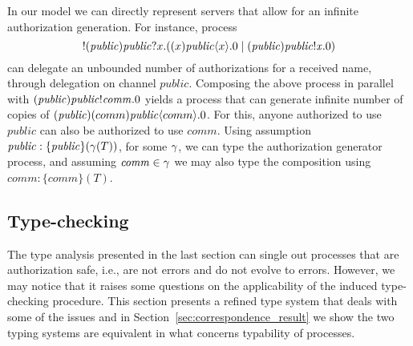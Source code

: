 In our model we can directly represent servers that allow for an infinite authorization generation. For instance, process 
$$
!({\mathit{public}}){\mathit{public}}?x.((x)\mathit{public}\langle x\rangle.0 \;|\; (\mathit{public})\mathit{public}!\mathit{x}.0)
$$
can delegate an unbounded number of authorizations for a received name, through delegation on channel $\mathit{public}$. 
Composing the above process in parallel with $(\mathit{public})\mathit{public}!\mathit{comm}.0$ yields a process that can generate infinite number of copies of 
$(\mathit{public})(comm)\mathit{public}\langle comm\rangle.0$.  For this, anyone authorized to use $\mathit{public}$ can also be authorized to use $\mathit{comm}$.  
%
Using assumption $\mathit{public}: \{\mathit{public}\}(\gamma(T))$, for some $\gamma$, we can type the authorization generator process, and assuming $\mathit{comm} \in \gamma$ we may also type the composition using $\mathit{comm}: \{\mathit{comm}\}(T)$.







\subsection{Type-checking}{\label{sec:TypeChecking}}


The type analysis presented in the last section can single out processes that are authorization safe, i.e.,  are not errors and do not evolve to errors. However, we may notice that it raises some questions on the applicability of  the induced type-checking procedure.
This section presents a refined type system that deals with some of the issues
and in Section~\ref{sec:correspondence_result} we show the two typing systems are equivalent in what concerns typability of processes.

